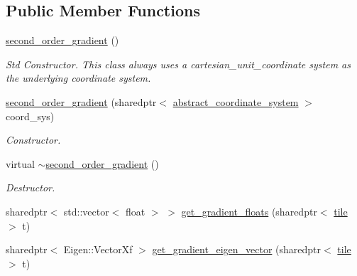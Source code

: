 \subsection*{Public Member Functions}
\begin{DoxyCompactItemize}
\item 
\hypertarget{classsecond__order__gradient_ab188e5caf3d7739c254e181197766adb}{\hyperlink{classsecond__order__gradient_ab188e5caf3d7739c254e181197766adb}{second\-\_\-order\-\_\-gradient} ()}\label{classsecond__order__gradient_ab188e5caf3d7739c254e181197766adb}

\begin{DoxyCompactList}\small\item\em Std Constructor. This class always uses a cartesian\-\_\-unit\-\_\-coordinate system as the underlying coordinate system. \end{DoxyCompactList}\item 
\hypertarget{classsecond__order__gradient_a2ba4cf69f1e941099a618d1b6a9c5f2a}{\hyperlink{classsecond__order__gradient_a2ba4cf69f1e941099a618d1b6a9c5f2a}{second\-\_\-order\-\_\-gradient} (sharedptr$<$ \hyperlink{classabstract__coordinate__system}{abstract\-\_\-coordinate\-\_\-system} $>$ coord\-\_\-sys)}\label{classsecond__order__gradient_a2ba4cf69f1e941099a618d1b6a9c5f2a}

\begin{DoxyCompactList}\small\item\em Constructor. \end{DoxyCompactList}\item 
\hypertarget{classsecond__order__gradient_a4adcb194a263b8eb0cb9162dd0f272d8}{virtual \hyperlink{classsecond__order__gradient_a4adcb194a263b8eb0cb9162dd0f272d8}{$\sim$second\-\_\-order\-\_\-gradient} ()}\label{classsecond__order__gradient_a4adcb194a263b8eb0cb9162dd0f272d8}

\begin{DoxyCompactList}\small\item\em Destructor. \end{DoxyCompactList}\item 
sharedptr$<$ std\-::vector$<$ float $>$ $>$ \hyperlink{classsecond__order__gradient_a611bd811d9a47b0a53b7a827344189ff}{get\-\_\-gradient\-\_\-floats} (sharedptr$<$ \hyperlink{classtile}{tile} $>$ t)
\item 
sharedptr$<$ Eigen\-::\-Vector\-Xf $>$ \hyperlink{classsecond__order__gradient_a920ecf0cbc89fa73782a318186cc3a6b}{get\-\_\-gradient\-\_\-eigen\-\_\-vector} (sharedptr$<$ \hyperlink{classtile}{tile} $>$ t)
\end{DoxyCompactItemize}


